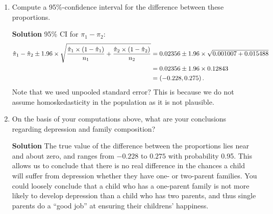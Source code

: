 \begin{enumerate}
\begin{enumerate}
        \item Compute a 95\%-confidence interval for the difference between these proportions.
        \begin{framed}{\textbf{Solution}}
        95\% CI for $\pi_1 - \pi_2$: 
        \begin{align}
            \Hat{\pi}_1 - \Hat{\pi}_2 \pm 1.96 \times \sqrt{\frac{\Hat{\pi}_1 \times \left( 1-\Hat{\pi}_1 \right)}{n_1} + \frac{\Hat{\pi}_2 \times \left( 1-\Hat{\pi}_2 \right)}{n_2}} &= 0.02356 \pm 1.96 \times \sqrt{0.001007 + 0.015488} \\
            &= 0.02356 \pm 1.96 \times 0.12843 \\
            &= \left( -0.228 , 0.275\right).
        \end{align}
        Note that we used unpooled standard error? This is because we do not assume homoskedasticity in the population as it is not plausible. 
        \end{framed}
        
        \item On the basis of your computations above, what are your conclusions regarding depression and family composition?
        \begin{framed}{\textbf{Solution}}
        The true value of the difference between the proportions lies near and about zero, and ranges from $-0.228$ to $0.275$ with probability 0.95. This allows us to conclude that there is no real difference in the chances a child will suffer from depression whether they have one- or two-parent families. You could loosely conclude that a child who has a one-parent family is not more likely to develop depression than a child who has two parents, and thus single parents do a ``good job'' at ensuring their childrens' happiness.
        \end{framed}
    \end{enumerate}
    

\end{enumerate}

